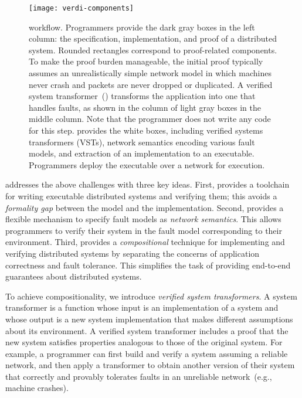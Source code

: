 \begin{figure*}
\texttt{[image: verdi-components]}

\caption{\Verdi workflow.  Programmers provide the dark gray boxes in
  the left column: the specification, implementation, and proof of a
  distributed system.  Rounded rectangles correspond to proof-related
  components.  To make the proof burden manageable, the initial proof
  typically assumes an unrealistically simple network model in which
  machines never crash and packets are never dropped or duplicated.  A
  verified system transformer~(\VST) transforms the application into
  one that handles faults, as shown in the column of light gray boxes
  in the middle column.  Note that the programmer does not write any
  code for this step. \Verdi provides the white boxes, including
  verified systems transformers (VSTs), network semantics encoding
  various fault models, and extraction of an implementation to an
  executable.  Programmers deploy the executable over a network for
  execution.}

\label{fig:verdi-components}
\end{figure*}

\Verdi addresses the above challenges with three key ideas.
%
First, \Verdi provides a \Coq toolchain for writing executable distributed
systems and verifying them; this avoids a \emph{formality gap} between the
model and the implementation.
%
Second, \Verdi provides a flexible mechanism to specify fault models as
\emph{network semantics}.
%
This allows programmers to verify their system in the fault model
corresponding to their environment.
%
Third, \Verdi provides a \emph{compositional} technique for
implementing and verifying distributed systems by separating the
concerns of application correctness and fault tolerance.
%
This simplifies the task of providing end-to-end guarantees about
distributed systems.

To achieve compositionality, we introduce \textit{verified
system transformers}.
%
A system transformer is a function whose input is an
implementation of a system and whose output is a new system implementation that
makes different assumptions about its environment.
%
A verified system transformer
includes a proof that the new system
satisfies properties analogous to those of the original system.
%
For example, a \Verdi programmer can first build and verify a system
assuming a reliable network, and then apply a transformer to obtain
another version of their system that correctly and provably
tolerates faults in an unreliable network~(e.g., machine crashes).

